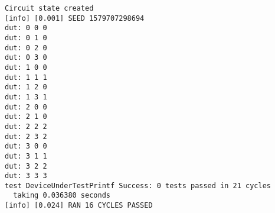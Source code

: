 \documentclass[%
    10pt,
    headinclude, footexclude,
    openright, %
    notitlepage,
    cleardoubleempty,
    headsepline,
    pointlessnumbers,
    bibtotoc, idxtotoc,
    ]{scrbook}
\newcommand{\myref}[2]{\href{#1}{#2}}
\renewcommand{\myref}[2]{{#2}{\footnote{\url{#1}}}}
\newif\ifshoworiginal
\newif\ifshowtransfirst
\newif\ifshowtranssecond
\begin{document}

\ifshoworiginal
\noindent When testing this module with the counter based tester, which iterates over all possible
values, we get following output, verifying that the AND function is correct:
\fi

\ifshowtransfirst %
すべての可能な値に対して反復カウンタベースのテスター、とこのモジュールをテストするとき、私たちは、AND関数が正しいことを確認し、次のような出力が得られます。
\fi

\ifshowtranssecond %
\noindent すべての可能な値を繰り返し処理するカウンタベースのテスターを使ってこのモジュールをテストすると、以下のような出力が得られます。AND関数が正しいことが確認できます。
\fi

\begin{verbatim}
Circuit state created
[info] [0.001] SEED 1579707298694
dut: 0 0 0
dut: 0 1 0
dut: 0 2 0
dut: 0 3 0
dut: 1 0 0
dut: 1 1 1
dut: 1 2 0
dut: 1 3 1
dut: 2 0 0
dut: 2 1 0
dut: 2 2 2
dut: 2 3 2
dut: 3 0 0
dut: 3 1 1
dut: 3 2 2
dut: 3 3 3
test DeviceUnderTestPrintf Success: 0 tests passed in 21 cycles
  taking 0.036380 seconds
[info] [0.024] RAN 16 CYCLES PASSED
\end{verbatim}

\ifshoworiginal
Chisel printf supports
\myref{https://github.com/freechipsproject/chisel3/wiki/Printing-in-Chisel}{C and Scala style formatting}.
\fi

\ifshowtransfirst %
Chiselのprintfは\myref{https://github.com/freechipsproject/chisel3/wiki/Printing-in-Chisel}{C and Scala style formatting}をサポートしています。
\fi

\ifshowtranssecond %
Chiselのprintfは\myref{https://github.com/freechipsproject/chisel3/wiki/Printing-in-Chisel}{C and Scala style formatting}をサポートしています。
\fi

\ifshoworiginal
\section{Exercises}
\fi
\ifshowtransfirst %
\section{Exercises}
\fi
\ifshowtranssecond %
\section{演習}
\fi
\end{document}
